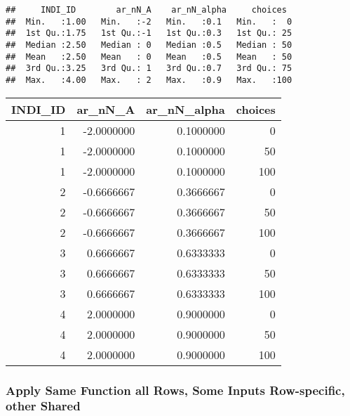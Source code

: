 \documentclass[
]{book}
\newenvironment{Shaded}{\begin{snugshade}}{\end{snugshade}}
\newcommand{\KeywordTok}[1]{\textcolor[rgb]{0.13,0.29,0.53}{\textbf{#1}}}
\newcommand{\NormalTok}[1]{#1}
\newcommand{\OperatorTok}[1]{\textcolor[rgb]{0.81,0.36,0.00}{\textbf{#1}}}
\newcommand{\StringTok}[1]{\textcolor[rgb]{0.31,0.60,0.02}{#1}}
\begin{document}
\begin{verbatim}
##     INDI_ID        ar_nN_A    ar_nN_alpha     choices   
##  Min.   :1.00   Min.   :-2   Min.   :0.1   Min.   :  0  
##  1st Qu.:1.75   1st Qu.:-1   1st Qu.:0.3   1st Qu.: 25  
##  Median :2.50   Median : 0   Median :0.5   Median : 50  
##  Mean   :2.50   Mean   : 0   Mean   :0.5   Mean   : 50  
##  3rd Qu.:3.25   3rd Qu.: 1   3rd Qu.:0.7   3rd Qu.: 75  
##  Max.   :4.00   Max.   : 2   Max.   :0.9   Max.   :100
\end{verbatim}

\begin{Shaded}
\end{Shaded}

\begin{table}[!h]
\centering
\begin{tabular}{r|r|r|r}
\hline
INDI\_ID & ar\_nN\_A & ar\_nN\_alpha & choices\\
\hline
\rowcolor{gray!6}  1 & -2.0000000 & 0.1000000 & 0\\
\hline
1 & -2.0000000 & 0.1000000 & 50\\
\hline
\rowcolor{gray!6}  1 & -2.0000000 & 0.1000000 & 100\\
\hline
2 & -0.6666667 & 0.3666667 & 0\\
\hline
\rowcolor{gray!6}  2 & -0.6666667 & 0.3666667 & 50\\
\hline
2 & -0.6666667 & 0.3666667 & 100\\
\hline
\rowcolor{gray!6}  3 & 0.6666667 & 0.6333333 & 0\\
\hline
3 & 0.6666667 & 0.6333333 & 50\\
\hline
\rowcolor{gray!6}  3 & 0.6666667 & 0.6333333 & 100\\
\hline
4 & 2.0000000 & 0.9000000 & 0\\
\hline
\rowcolor{gray!6}  4 & 2.0000000 & 0.9000000 & 50\\
\hline
4 & 2.0000000 & 0.9000000 & 100\\
\hline
\end{tabular}
\end{table}

\hypertarget{apply-same-function-all-rows-some-inputs-row-specific-other-shared}{%
\subsubsection{Apply Same Function all Rows, Some Inputs Row-specific, other Shared}\label{apply-same-function-all-rows-some-inputs-row-specific-other-shared}}
\end{document}
